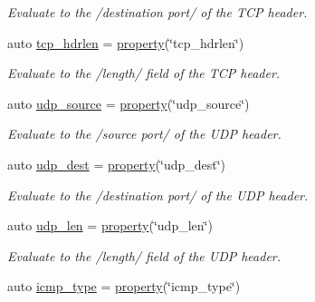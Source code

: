 \begin{DoxyCompactItemize}
\begin{DoxyCompactList}\small\item\em Evaluate to the /destination port/ of the T\+C\+P header. \end{DoxyCompactList}\item 
auto \hyperlink{namespacepfq_1_1lang_1_1anonymous__namespace_02default_8hpp_03_a678163384b58e4682bdbaf7efdd22cfb}{tcp\+\_\+hdrlen} = \hyperlink{namespacepfq_1_1lang_a3f461785d825c3f5e024dd65c18ea3dc}{property}(\char`\"{}tcp\+\_\+hdrlen\char`\"{})
\begin{DoxyCompactList}\small\item\em Evaluate to the /length/ field of the T\+C\+P header. \end{DoxyCompactList}\item 
auto \hyperlink{namespacepfq_1_1lang_1_1anonymous__namespace_02default_8hpp_03_ab44590359ef60febe9bfc6465bcf932a}{udp\+\_\+source} = \hyperlink{namespacepfq_1_1lang_a3f461785d825c3f5e024dd65c18ea3dc}{property}(\char`\"{}udp\+\_\+source\char`\"{})
\begin{DoxyCompactList}\small\item\em Evaluate to the /source port/ of the U\+D\+P header. \end{DoxyCompactList}\item 
auto \hyperlink{namespacepfq_1_1lang_1_1anonymous__namespace_02default_8hpp_03_a7c15d9ec0af24b9515acc8a04b7b1e2e}{udp\+\_\+dest} = \hyperlink{namespacepfq_1_1lang_a3f461785d825c3f5e024dd65c18ea3dc}{property}(\char`\"{}udp\+\_\+dest\char`\"{})
\begin{DoxyCompactList}\small\item\em Evaluate to the /destination port/ of the U\+D\+P header. \end{DoxyCompactList}\item 
auto \hyperlink{namespacepfq_1_1lang_1_1anonymous__namespace_02default_8hpp_03_ac7f1ef80a8ec46ce01aa12f66cfee86b}{udp\+\_\+len} = \hyperlink{namespacepfq_1_1lang_a3f461785d825c3f5e024dd65c18ea3dc}{property}(\char`\"{}udp\+\_\+len\char`\"{})
\begin{DoxyCompactList}\small\item\em Evaluate to the /length/ field of the U\+D\+P header. \end{DoxyCompactList}\item 
auto \hyperlink{namespacepfq_1_1lang_1_1anonymous__namespace_02default_8hpp_03_a0c15abbec8753be8bb160633f697ed4b}{icmp\+\_\+type} = \hyperlink{namespacepfq_1_1lang_a3f461785d825c3f5e024dd65c18ea3dc}{property}(\char`\"{}icmp\+\_\+type\char`\"{})

\end{DoxyCompactItemize}
